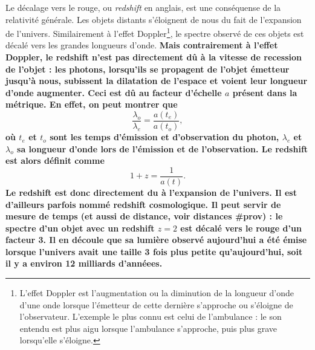 \documentclass[11pt, twoside, a4paper, openright]{report}
\begin{document}
Le décalage vers le rouge, ou \emph{redshift} en anglais, est une conséquense de la relativité générale. Les objets distants s'éloignent de nous du fait de l'expansion de l'univers. Similairement à l'effet Doppler\footnote{L'effet Doppler est l'augmentation ou la diminution de la longueur d'onde d'une onde lorsque l'émetteur de cette dernière s'approche ou s'éloigne de l'observateur. L'exemple le plus connu est celui de l'ambulance : le son entendu est plus aigu lorsque l'ambulance s'approche, puis plus grave lorsqu'elle s'éloigne.}, le spectre observé de ces objets est décalé vers les grandes longueurs d'onde. \textbf{Mais contrairement à l'effet Doppler, le redshift n'est pas directement dû à la vitesse de recession de l'objet : les photons, lorsqu'ils se propagent de l'objet émetteur jusqu'à nous, subissent la dilatation de l'espace et voient leur longueur d'onde augmenter. Ceci est dû au facteur d'échelle $a$ présent dans la métrique. En effet, on peut montrer que
\begin{equation}
  \frac{\lambda_o}{\lambda_e} = \frac{a(t_e)}{a(t_o)} ,
\end{equation}
où $t_e$ et $t_o$ sont les temps d'émission et d'observation du photon, $\lambda_{e}$  et $\lambda_{o}$ sa longueur d'onde lors de l'émission et de l'observation. Le redshift est alors définit comme 
\begin{equation}
  \label{eq:redshift}
  1 + z = \frac{1}{a(t)}.
\end{equation}
Le redshift est donc directement du à l'expansion de l'univers. Il est d'ailleurs parfois nommé redshift cosmologique. Il peut servir de mesure de temps (et aussi de distance, voir distances \#prov) : le spectre d'un objet avec un redshift $z=2$ est décalé vers le rouge d'un facteur 3. Il en découle que sa lumière observé aujourd'hui a été émise lorsque l'univers avait une taille 3 fois plus petite qu'aujourd'hui, soit il y a environ 12 milliards d'annéees.}

\end{document}
